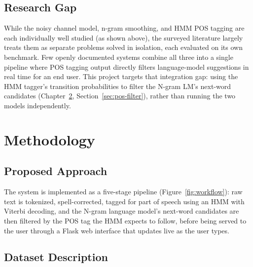 \documentclass[12pt,a4paper]{report}
\begin{document}
\section{Research Gap}

While the noisy channel model, n-gram smoothing, and HMM POS tagging are
each individually well studied (as shown above), the surveyed literature
largely treats them as separate problems solved in isolation, each
evaluated on its own benchmark. Few openly documented systems combine all
three into a single pipeline where POS tagging output directly filters
language-model suggestions in real time for an end user. This project
targets that integration gap: using the HMM tagger's transition
probabilities to filter the N-gram LM's next-word candidates
(Chapter~\ref{ch:methodology}, Section~\ref{sec:pos-filter}), rather than
running the two models independently.

\chapter{Methodology}
\label{ch:methodology}

\section{Proposed Approach}

The system is implemented as a five-stage pipeline (Figure~\ref{fig:workflow}):
raw text is tokenized, spell-corrected, tagged for part of speech using an
HMM with Viterbi decoding, and the N-gram language model's next-word
candidates are then filtered by the POS tag the HMM expects to follow,
before being served to the user through a Flask web interface that
updates live as the user types.

\section{Dataset Description}
\end{document}
